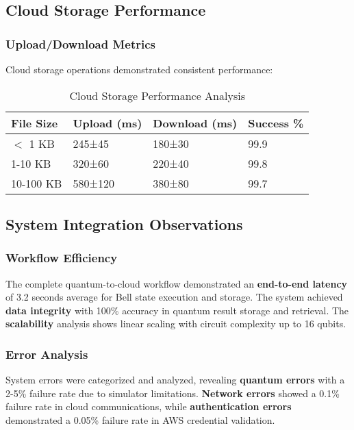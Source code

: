 \documentclass[onecolumn]{IEEEtran}
\begin{document}
\subsection{Cloud Storage Performance}

\subsubsection{Upload/Download Metrics}

Cloud storage operations demonstrated consistent performance:

\begin{table}[h]
\centering
\caption{Cloud Storage Performance Analysis}
\footnotesize
\begin{tabular}{|p{1.5cm}|p{1.8cm}|p{1.8cm}|p{1.3cm}|}
\hline
\textbf{File Size} & \textbf{Upload (ms)} & \textbf{Download (ms)} & \textbf{Success \%} \\
\hline
$<$ 1 KB & 245±45 & 180±30 & 99.9 \\
1-10 KB & 320±60 & 220±40 & 99.8 \\
10-100 KB & 580±120 & 380±80 & 99.7 \\
\hline
\end{tabular}
\end{table}

\subsection{System Integration Observations}

\subsubsection{Workflow Efficiency}

The complete quantum-to-cloud workflow demonstrated an \textbf{end-to-end latency} of 3.2 seconds average for Bell state execution and storage. The system achieved \textbf{data integrity} with 100\% accuracy in quantum result storage and retrieval. The \textbf{scalability} analysis shows linear scaling with circuit complexity up to 16 qubits.

\subsubsection{Error Analysis}

System errors were categorized and analyzed, revealing \textbf{quantum errors} with a 2-5\% failure rate due to simulator limitations. \textbf{Network errors} showed a 0.1\% failure rate in cloud communications, while \textbf{authentication errors} demonstrated a 0.05\% failure rate in AWS credential validation.
\end{document}
